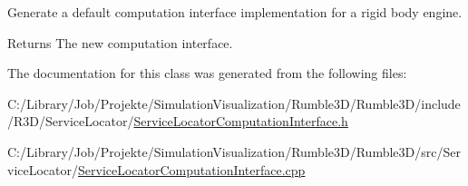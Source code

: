 Generate a default computation interface implementation for a rigid body engine. 

\begin{DoxyReturn}{Returns}
The new computation interface. 
\end{DoxyReturn}


The documentation for this class was generated from the following files\+:\begin{DoxyCompactItemize}
\item 
C\+:/\+Library/\+Job/\+Projekte/\+Simulation\+Visualization/\+Rumble3\+D/\+Rumble3\+D/include/\+R3\+D/\+Service\+Locator/\mbox{\hyperlink{_service_locator_computation_interface_8h}{Service\+Locator\+Computation\+Interface.\+h}}\item 
C\+:/\+Library/\+Job/\+Projekte/\+Simulation\+Visualization/\+Rumble3\+D/\+Rumble3\+D/src/\+Service\+Locator/\mbox{\hyperlink{_service_locator_computation_interface_8cpp}{Service\+Locator\+Computation\+Interface.\+cpp}}\end{DoxyCompactItemize}
